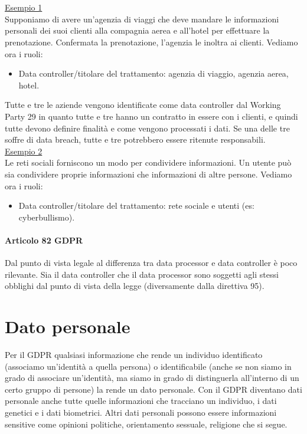 \noindent \\\\\underline{Esempio 1}
\\

\noindent Supponiamo di avere un'agenzia di viaggi che deve mandare le informazioni personali dei suoi clienti alla compagnia aerea e all'hotel per effettuare la prenotazione. Confermata la prenotazione, l'agenzia le inoltra ai clienti. Vediamo ora i ruoli:
\begin{itemize}
    \item Data controller/titolare del trattamento: agenzia di viaggio, agenzia aerea, hotel.
\end{itemize}

\noindent Tutte e tre le aziende vengono identificate come data controller dal Working Party 29 in quanto tutte e tre hanno un contratto in essere con i clienti, e quindi tutte devono definire finalità e come vengono processati i dati. Se una delle tre soffre di data breach, tutte e tre potrebbero essere ritenute responsabili.
\\

\noindent \underline{Esempio 2}
\\

\noindent Le reti sociali forniscono un modo per condividere informazioni. Un utente può sia condividere proprie informazioni che informazioni di altre persone. Vediamo ora i ruoli:
\begin{itemize}
    \item Data controller/titolare del trattamento: rete sociale e utenti (es: cyberbullismo).
\end{itemize}
   
\paragraph{Articolo 82 GDPR} Dal punto di vista legale al differenza tra data processor e data controller è poco rilevante. Sia il data controller che il data processor sono soggetti agli stessi obblighi dal punto di vista della legge (diversamente dalla direttiva 95).

\section{Dato personale}
Per il GDPR qualsiasi informazione che rende un individuo identificato (associamo un'identità a quella persona) o identificabile (anche se non siamo in grado di associare un'identità, ma siamo in grado di distinguerla all'interno di un certo gruppo di persone) la rende un dato personale. Con il GDPR diventano dati personale anche tutte quelle informazioni che tracciano un individuo, i dati genetici e i dati biometrici. Altri dati personali possono essere informazioni sensitive come opinioni politiche, orientamento sessuale, religione che si segue. 
\\

